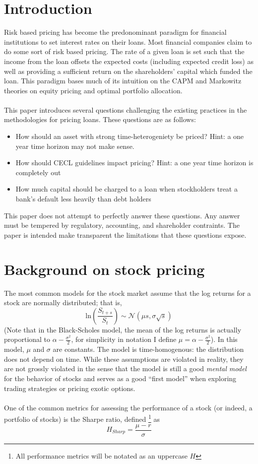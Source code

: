 \documentclass{article}
\begin{document}


\section{Introduction}
Risk based pricing has become the predonominant paradigm for financial institutions to set interest rates on their loans.  Most financial companies claim to do some sort of risk based pricing.  The rate of a given loan is set such that the income from the loan offsets the expected costs (including expected credit loss) as well as providing a sufficient return on the shareholders' capital which funded the loan.  This paradigm bases much of its intuition on the CAPM and Markowitz theories on equity pricing and optimal portfolio allocation.  
\\
\\
This paper introduces several questions challenging the existing practices in the methodologies for pricing loans.  These questions are as follows:
\begin{itemize}
\item How should an asset with strong time-heterogeniety be priced?  Hint: a one year time horizon may not make sense.
\item How should CECL guidelines impact pricing? Hint: a one year time horizon is completely out
\item How much capital should be charged to a loan when stockholders treat a bank's default less heavily than debt holders
\end{itemize}

This paper does not attempt to perfectly answer these questions.  Any answer must be tempered by regulatory, accounting, and shareholder contraints.  The paper is intended make transparent the limitations that these questions expose.  

\section{Background on stock pricing}

The most common models for the stock market assume that the log returns for a stock are normally distributed; that is,
\[\mathrm{ln}\left(\frac{S_{t+s}}{S_t}\right) \sim \mathcal{N}(\mu s, \sigma \sqrt{s})\]
(Note that in the Black-Scholes model, the mean of the log returns is actually proportional to \(\alpha-\frac{\sigma^2}{2}\), for simplicity in notation I define \(\mu=\alpha-\frac{\sigma^2}{2}\)).  In this model, \(\mu\) and \(\sigma\) are constants.  The model is time-homogenous: the distribution does not depend on time.  While these assumptions are violated in reality, they are not grossly violated in the sense that the model is still a good \emph{mental model} for the behavior of stocks and serves as a good ``first model'' when exploring trading strategies or pricing exotic options.  
\\
\\
One of the common metrics for assessing the performance of a stock (or indeed, a portfolio of stocks) is the Sharpe ratio, defined \footnote{All performance metrics will be notated as an uppercase \(H\)} as 
\[H_{Sharp}=\frac{\mu-r}{\sigma}\]
\end{document}
